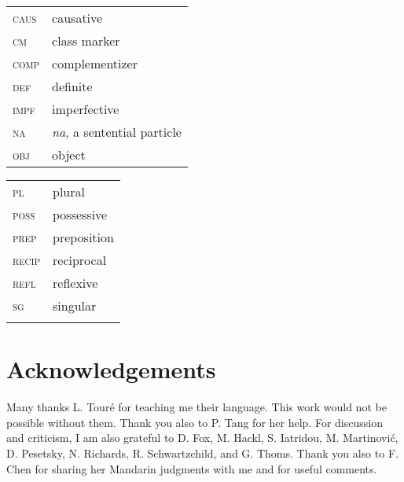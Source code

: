 \documentclass[output=paper]{langscibook}
\begin{document}
\begin{tabularx}{.5\textwidth}{@{}lX@{}}
\textsc{caus} & causative\\
\textsc{cm} & class marker\\
\textsc{comp} & complementizer\\
\textsc{def} & definite\\
\textsc{impf} & imperfective\\
\textsc{na} & \textit{na}, a sentential particle\\
\textsc{obj} & object\\
\end{tabularx}%
\begin{tabularx}{.5\textwidth}{@{}lX@{}}
\textsc{pl} & plural\\
\textsc{poss} & possessive\\  
\textsc{prep} & preposition\\
\textsc{recip} & reciprocal\\
\textsc{refl} & reflexive\\
\textsc{sg} & singular\\
&\\
\end{tabularx}



\section*{Acknowledgements}
Many thanks L. Tour\'{e} for teaching me their language. This work would not be possible without them. Thank you also to P. Tang for her help. For discussion and criticism, I am also grateful to D. Fox, M. Hackl, S. Iatridou, M. Martinovi\'{c}, D. Pesetsky, N. Richards, R. Schwartzchild, and G. Thoms. Thank you also to F. Chen for sharing her Mandarin judgments with me and for useful comments.

{\sloppy\printbibliography[heading=subbibliography,notkeyword=this]}
\end{document}
